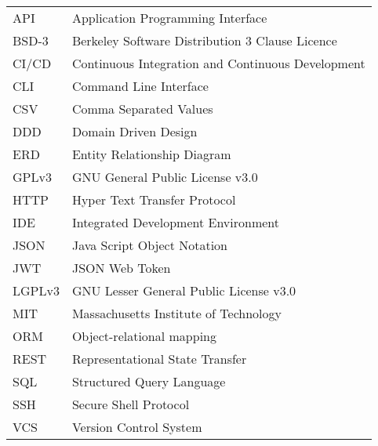 \begin{longtable}{p{3cm}p{10cm}}
    API&Application Programming Interface\\
    BSD-3&Berkeley Software Distribution 3 Clause Licence\\
    CI/CD&Continuous Integration and Continuous Development\\
    CLI&Command Line Interface\\
    CSV&Comma Separated Values\\
    DDD&Domain Driven Design\\
    ERD&Entity Relationship Diagram\\
    GPLv3&GNU General Public License v3.0\\
    HTTP&Hyper Text Transfer Protocol\\
    IDE&Integrated Development Environment\\
    JSON&Java Script Object Notation\\
    JWT&JSON Web Token\\
    LGPLv3&GNU Lesser General Public License v3.0\\
    MIT&Massachusetts Institute of Technology\\
    ORM&Object-relational mapping\\
    REST&Representational State Transfer\\
    SQL&Structured Query Language\\
    SSH&Secure Shell Protocol\\
    VCS&Version Control System\\
\end{longtable}
\addtocounter{table}{-1}
